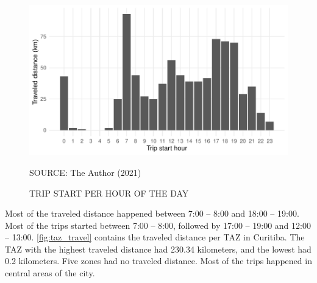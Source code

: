 \begin{figure}[!htbp]
    \centering\footnotesize
    \captionsetup{font=footnotesize}
    \caption{TRIP START PER HOUR OF THE DAY}
    \includegraphics{fig/hotd_trip.pdf}
    \label{fig:hotd_trips}
    \par SOURCE: The Author (2021)
\end{figure}

Most of the traveled distance happened between 7:00 – 8:00 and 18:00 – 19:00. Most of the trips started between 7:00 – 8:00, followed by 17:00 – 19:00 and 12:00 – 13:00. \autoref{fig:taz_travel} contains the traveled distance per TAZ in Curitiba. The TAZ with the highest traveled distance had 230.34 kilometers, and the lowest had 0.2 kilometers. Five zones had no traveled distance. Most of the trips happened in central areas of the city.


